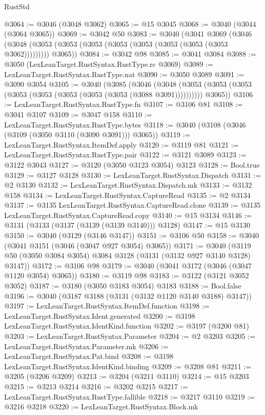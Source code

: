 \begin{lexlean}{RustStd}
\begin{coremodule}
{\begin{coremodule}
{{{{{{{{{{{{{{{{{{{{{{{{{{{{{{{{{{{{{@3064 := @3046 (@3048 @3062)
@3065 := @15 @3045
@3068 := @3040 (@3044 (@3064 @3065))
@3069 := @3042 @50
@3083 := @3040
    (@3041
      @3069
      (@3046 (@3048 (@3053 (@3053 (@3053 (@3053 (@3053 (@3053 (@3053 (@3053 @3062))))))))) @3065))
@3084 := @3042 @98
@3085 := @3041 @3084
@3088 := @3050 (LexLeanTarget.RustSyntax.RustType.rc @3069)
@3089 := LexLeanTarget.RustSyntax.RustType.nat
@3090 := @3050 @3089
@3091 := @3090 @3054
@3105 := @3040
    (@3085
      (@3046
        (@3048 (@3053 (@3053 (@3053 (@3053 (@3053 (@3053 (@3053 (@3053 (@3088 @3091))))))))))
        @3065))
@3106 := LexLeanTarget.RustSyntax.RustType.fn
@3107 := @3106 @81
@3108 := @3041 @3107
@3109 := @3047 @158
@3110 := LexLeanTarget.RustSyntax.RustType.bytes
@3118 := @3040 (@3108 (@3046 (@3109 (@3050 @3110 (@3090 @3091))) @3065))
@3119 := LexLeanTarget.RustSyntax.ItemDef.apply
@3120 := @3119 @81
@3121 := LexLeanTarget.RustSyntax.RustType.pair
@3122 := @3121 @3089
@3123 := @3122 @3043
@3127 := @3120 (@3050 @3123 @3054) @3123
@3128 := Bool.true
@3129 := @3127 @3128
@3130 := LexLeanTarget.RustSyntax.Dispatch
@3131 := @2 @3130
@3132 := LexLeanTarget.RustSyntax.Dispatch.mk
@3133 := @3132 @158
@3134 := LexLeanTarget.RustSyntax.CaptureRead
@3135 := @2 @3134
@3137 := @3135 LexLeanTarget.RustSyntax.CaptureRead.clone
@3139 := @3135 LexLeanTarget.RustSyntax.CaptureRead.copy
@3140 := @15 @3134
@3146 := @3131 (@3133 (@3137 (@3139 (@3139 @3140))) @3128)
@3147 := @15 @3130
@3150 := @3040 (@3129 (@3146 @3147))
@3151 := @3106 @50
@3158 := @3040 (@3041 @3151 (@3046 (@3047 @927 @3054) @3065))
@3171 := @3040 (@3119 @50 (@3050 @3084 @3054) @3084 @3128 (@3131 (@3132 @927 @3140 @3128) @3147))
@3172 := @3106 @98
@3179 := @3040 (@3041 @3172 (@3046 (@3047 @1120 @3054) @3065))
@3180 := @3119 @98
@3183 := @3122 (@3121 @3052 @3052)
@3187 := @3180 (@3050 @3183 @3054) @3183
@3188 := Bool.false
@3196 := @3040 (@3187 @3188 (@3131 (@3132 @1120 @3140 @3188) @3147))
@3197 := LexLeanTarget.RustSyntax.ItemDef.function
@3198 := LexLeanTarget.RustSyntax.Ident.generated
@3200 := @3198 LexLeanTarget.RustSyntax.IdentKind.function
@3202 := @3197 (@3200 @81)
@3203 := LexLeanTarget.RustSyntax.Parameter
@3204 := @2 @3203
@3205 := LexLeanTarget.RustSyntax.Parameter.mk
@3206 := LexLeanTarget.RustSyntax.Pat.bind
@3208 := @3198 LexLeanTarget.RustSyntax.IdentKind.binding
@3209 := @3208 @81
@3211 := @3205 (@3206 @3209)
@3213 := @3204 (@3211 @3110)
@3214 := @15 @3203
@3215 := @3213 @3214
@3216 := @3202 @3215
@3217 := LexLeanTarget.RustSyntax.RustType.fallible
@3218 := @3217 @3110
@3219 := @3216 @3218
@3220 := LexLeanTarget.RustSyntax.Block.mk
}}}}}}}}}}}}}}}}}}}}}}}}}}}}}}}}}}}}}
\end{coremodule}}
\end{coremodule}
\end{lexlean}
